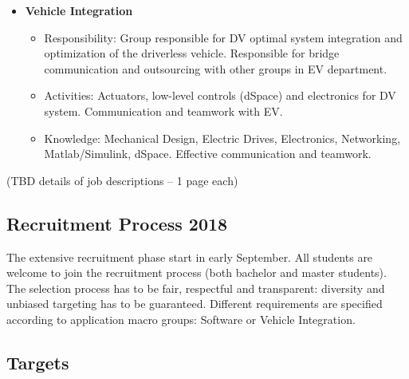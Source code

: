 \documentclass[graybox]{svmult}
\begin{document}
\begin{itemize}
	\item \textbf{Vehicle Integration}
	\begin{itemize}
		\item Responsibility: Group responsible for DV optimal system integration and optimization of the driverless vehicle. Responsible for bridge communication and outsourcing with other groups in EV department.
		\item Activities: Actuators, low-level controls (dSpace) and electronics for DV system. Communication and teamwork with EV.
		\item Knowledge: Mechanical Design, Electric Drives, Electronics, Networking, Matlab/Simulink, dSpace. Effective communication and teamwork.
	\end{itemize}
\end{itemize}

(TBD details of job descriptions – 1 page each)

\subsection{Recruitment Process 2018}

The extensive recruitment phase start in early September.
All students are welcome to join the recruitment process (both bachelor and master students).
The selection process has to be fair, respectful and transparent: diversity and unbiased targeting has to be guaranteed.
Different requirements are specified according to application macro groups: Software or Vehicle Integration.

\subsection{Targets}
\end{document}
